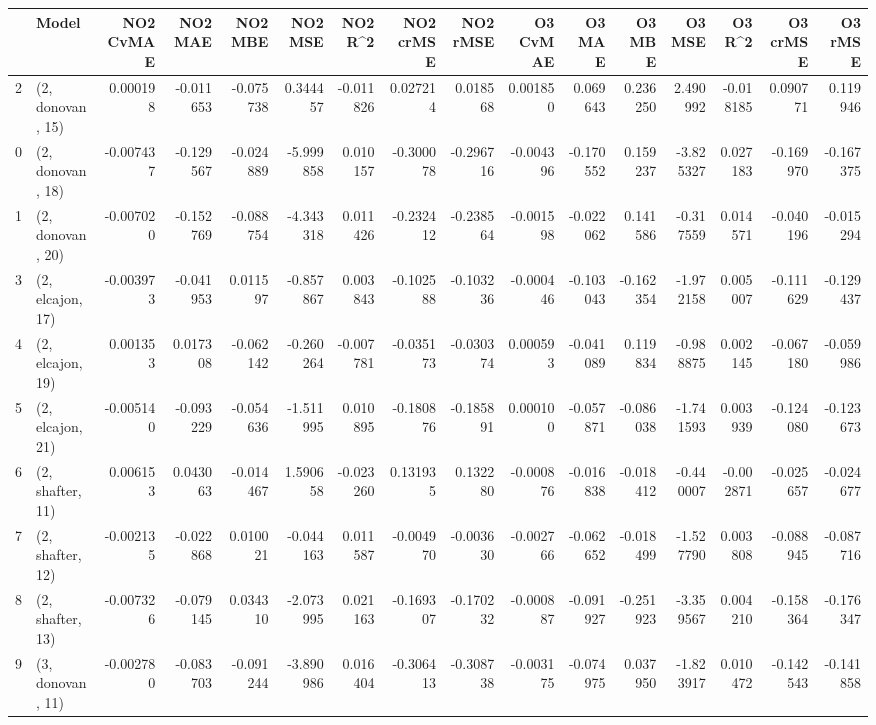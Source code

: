 \begin{tabular}{llrrrrrrrrrrrrrr}
\toprule
{} &             Model &  NO2 CvMAE &   NO2 MAE &   NO2 MBE &    NO2 MSE &   NO2 R\textasciicircum2 &  NO2 crMSE &  NO2 rMSE &  O3 CvMAE &    O3 MAE &    O3 MBE &     O3 MSE &    O3 R\textasciicircum2 &  O3 crMSE &   O3 rMSE \\
\midrule
2  &  (2, donovan, 15) &   0.000198 & -0.011653 & -0.075738 &   0.344457 & -0.011826 &   0.027214 &  0.018568 &  0.001850 &  0.069643 &  0.236250 &   2.490992 & -0.018185 &  0.090771 &  0.119946 \\
0  &  (2, donovan, 18) &  -0.007437 & -0.129567 & -0.024889 &  -5.999858 &  0.010157 &  -0.300078 & -0.296716 & -0.004396 & -0.170552 &  0.159237 &  -3.825327 &  0.027183 & -0.169970 & -0.167375 \\
1  &  (2, donovan, 20) &  -0.007020 & -0.152769 & -0.088754 &  -4.343318 &  0.011426 &  -0.232412 & -0.238564 & -0.001598 & -0.022062 &  0.141586 &  -0.317559 &  0.014571 & -0.040196 & -0.015294 \\
3  &  (2, elcajon, 17) &  -0.003973 & -0.041953 &  0.011597 &  -0.857867 &  0.003843 &  -0.102588 & -0.103236 & -0.000446 & -0.103043 & -0.162354 &  -1.972158 &  0.005007 & -0.111629 & -0.129437 \\
4  &  (2, elcajon, 19) &   0.001353 &  0.017308 & -0.062142 &  -0.260264 & -0.007781 &  -0.035173 & -0.030374 &  0.000593 & -0.041089 &  0.119834 &  -0.988875 &  0.002145 & -0.067180 & -0.059986 \\
5  &  (2, elcajon, 21) &  -0.005140 & -0.093229 & -0.054636 &  -1.511995 &  0.010895 &  -0.180876 & -0.185891 &  0.000100 & -0.057871 & -0.086038 &  -1.741593 &  0.003939 & -0.124080 & -0.123673 \\
6  &  (2, shafter, 11) &   0.006153 &  0.043063 & -0.014467 &   1.590658 & -0.023260 &   0.131935 &  0.132280 & -0.000876 & -0.016838 & -0.018412 &  -0.440007 & -0.002871 & -0.025657 & -0.024677 \\
7  &  (2, shafter, 12) &  -0.002135 & -0.022868 &  0.010021 &  -0.044163 &  0.011587 &  -0.004970 & -0.003630 & -0.002766 & -0.062652 & -0.018499 &  -1.527790 &  0.003808 & -0.088945 & -0.087716 \\
8  &  (2, shafter, 13) &  -0.007326 & -0.079145 &  0.034310 &  -2.073995 &  0.021163 &  -0.169307 & -0.170232 & -0.000887 & -0.091927 & -0.251923 &  -3.359567 &  0.004210 & -0.158364 & -0.176347 \\
9  &  (3, donovan, 11) &  -0.002780 & -0.083703 & -0.091244 &  -3.890986 &  0.016404 &  -0.306413 & -0.308738 & -0.003175 & -0.074975 &  0.037950 &  -1.823917 &  0.010472 & -0.142543 & -0.141858 \\

\end{tabular}
